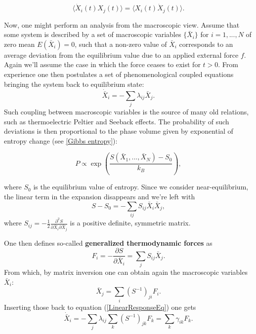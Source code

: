 \documentclass[a4paper,12pt]{article}
\begin{document}
\begin{equation}
\label{CorrelationTimeDerivative}
  \langle \dot{X}_i(t) X_j(t) \rangle = \langle X_i(t) \dot{X}_j(t) \rangle.
\end{equation}

Now, one might perform an analysis from the macroscopic view.
Assume that some system is described by a set of macroscopic variables $\{\bar{X}_i\}$ for $i=1,...,N$ of zero mean $E(\bar{X}_i)=0$, such that a non-zero value of $\bar{X}_i$ corresponds to an average deviation from the equilibrium value due to an applied external force $f$. Again we'll assume the case in which the force ceases to exist for $t>0$. From experience one then postulates a set of phenomenological coupled equations bringing the system back to equilibrium state: 
\begin{equation}
\label{LinearResponseEq}
  \dot{\bar{X}}_i=-\sum_j \lambda_{ij} \bar{X}_j.
\end{equation}
Such coupling between macroscopic variables is the source of many old relations, such as thermoelectric Peltier and Seeback effects. The probability of such deviations is then proportional to the phase volume given by exponential of entropy change (see \ref{Gibbs entropy}):

\begin{equation}
  P \propto \exp(\frac{S(\bar{X}_1,...,\bar{X}_N)-S_0}{k_B}),
\end{equation}

where $S_0$ is the equilibrium value of entropy. Since we consider near-equilibrium, the linear term in the expansion disappears and we're left with
\begin{equation}
  S-S_0 = - \sum_{ij} S_{ij}\bar{X}_i \bar{X}_j,
\end{equation}
where $S_{ij}= -\frac{1}{2}\frac{\partial^2{S}}{\partial{\bar{X}_i}\partial{\bar{X}_j}}$ is a positive definite, symmetric matrix. %

One then defines so-called \textbf{generalized thermodynamic forces} as
\begin{equation}
  F_i= -\frac{\partial{S}}{\partial{\bar{X}_i}}= \sum_j S_{ij}\bar{X}_j.
\end{equation}
From which, by matrix inversion one can obtain again the macroscopic variables $\bar{X}_i$:
\begin{equation}
  \bar{X}_j = \sum_i (S^{-1})_{ji} F_i.
\end{equation}
Inserting those back to equation (\ref{LinearResponseEq}) one gets
\begin{equation}
\label{FluxesOnMacroscopic}
  \dot{\bar{X}}_i=-\sum_j \lambda_{ij} \sum_k (S^{-1})_{jk} F_k = \sum_k \gamma_{ik} F_k.
\end{equation}
\end{document}
